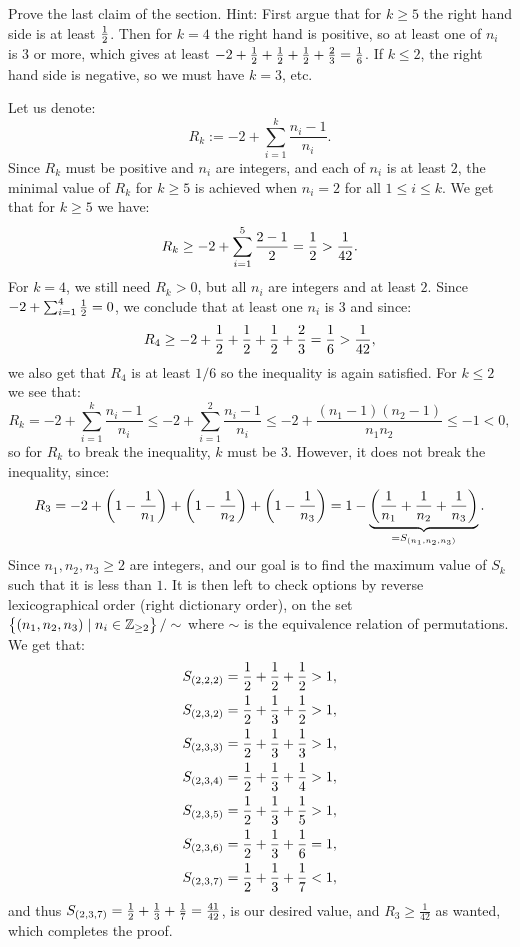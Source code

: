 \documentclass[11pt, a4paper]{article}
\begin{document}
\begin{exercise}
  Prove the last claim of the section.
  Hint: First argue that for $k \geq 5$ the right hand side is at least $\frac{1}{2}$.
  Then for $k = 4$ the right hand is positive,
  so at least one of $n_i$ is $3$ or more,
  which gives at least $-2 + \frac{1}{2} + \frac{1}{2} + \frac{1}{2} + \frac{2}{3} = \frac{1}{6}$.
  If $k \le 2$, the right hand side is negative, so we must have $k = 3$, etc.
\end{exercise}
\begin{solution}
  Let us denote:
  \[
    R_k := -2 + \sum_{i=1}^{k} \frac{n_i - 1}{n_i}.
  \]
  Since $R_k$ must be positive and $n_i$ are integers,
  and each of $n_i$ is at least $2$,
  the minimal value of $R_k$ for $k \geq 5$ is achieved when $n_i = 2$
  for all $1 \le i \le k$.
  We get that for $k \geq 5$ we have:
  \[
    R_k \geq -2 + \sum_{i=1}^{5} \frac{2 - 1}{2} = \frac{1}{2} > \frac{1}{42}.
  \]
  For $k = 4$, we still need $R_k > 0$,
  but all $n_i$ are integers and at least $2$.
  Since $-2 + \sum_{i=1}^{4} \frac{1}{2} = 0$,
  we conclude that at least one $n_i$ is $3$ and since:
  \[
    R_4 \geq -2 + \frac{1}{2} + \frac{1}{2} + \frac{1}{2} + \frac{2}{3} = \frac{1}{6} > \frac{1}{42},
  \]
  we also get that $R_4$ is at least $1/6$ so the inequality is again satisfied.
  For $k \le 2$ we see that:
  \[
    R_k =
    -2 + \sum_{i=1}^{k} \frac{n_i - 1}{n_i} \le
    -2 + \sum_{i=1}^{2} \frac{n_i - 1}{n_i} \le
    -2 + \frac{(n_1 - 1)(n_2 - 1)}{n_1 n_2} \le -1 < 0,
  \]
  so for $R_k$ to break the inequality, $k$ must be $3$.
  However, it does not break the inequality, since:
  \[
    R_3 =
    -2 + \del{1 - \frac{1}{n_1}} +
         \del{1 - \frac{1}{n_2}} +
         \del{1 - \frac{1}{n_3}} =
    1 -
      \underbrace{\del{\frac{1}{n_1} + \frac{1}{n_2} + \frac{1}{n_3}}}_{= S_{(n_1,n_2,n_3)}}.
  \]
  Since $n_1,n_2,n_3 \geq 2$ are integers, and our goal is to find
  the maximum value of $S_k$ such that it is less than $1$.
  It is then left to check options by reverse lexicographical order (right dictionary order),
  on the set $\left\{(n_1,n_2,n_3) \mid n_i \in \mathbb{Z}_{\geq 2}\right\}/\sim$
  where $\sim$ is the equivalence relation of permutations.
  We get that:
  \begin{align*}
    S_{(2,2,2)} &= \frac{1}{2} + \frac{1}{2} + \frac{1}{2} > 1, \\
    S_{(2,3,2)} &= \frac{1}{2} + \frac{1}{3} + \frac{1}{2} > 1, \\
    S_{(2,3,3)} &= \frac{1}{2} + \frac{1}{3} + \frac{1}{3} > 1, \\
    S_{(2,3,4)} &= \frac{1}{2} + \frac{1}{3} + \frac{1}{4} > 1, \\
    S_{(2,3,5)} &= \frac{1}{2} + \frac{1}{3} + \frac{1}{5} > 1, \\
    S_{(2,3,6)} &= \frac{1}{2} + \frac{1}{3} + \frac{1}{6} = 1, \\
    S_{(2,3,7)} &= \frac{1}{2} + \frac{1}{3} + \frac{1}{7} < 1,
  \end{align*}
  and thus $S_{(2,3,7)} = \frac{1}{2} + \frac{1}{3} + \frac{1}{7} = \frac{41}{42}$,
  is our desired value, and $R_3 \geq \frac{1}{42}$ as wanted,
  which completes the proof.
\end{solution}
\end{document}
